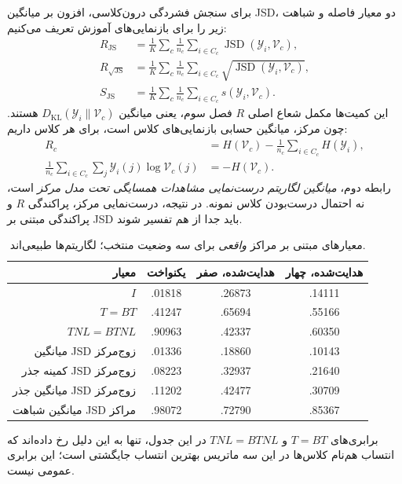 برای سنجش فشردگی درون‌کلاسی، افزون بر میانگین JSD، دو معیار فاصله و شباهت زیر را برای بازنمایی‌های آموزش تعریف می‌کنیم:
\begin{equation}\label{eq:ch4-center-observation-JS-within}
\begin{aligned}
R_{\mathrm{JS}}&=\frac1K\sum_c\frac1{n_c}\sum_{i\in C_c}
\operatorname{JSD}(\mathscr Y_i,\mathcal V_c),\\
R_{\sqrt{\mathrm{JS}}}&=\frac1K\sum_c\frac1{n_c}\sum_{i\in C_c}
\sqrt{\operatorname{JSD}(\mathscr Y_i,\mathcal V_c)},\\
S_{\mathrm{JS}}&=\frac1K\sum_c\frac1{n_c}\sum_{i\in C_c}
s(\mathscr Y_i,\mathcal V_c).
\end{aligned}
\end{equation}
این کمیت‌ها مکمل شعاع اصلی $R$ فصل سوم، یعنی میانگین $D_{\mathrm{KL}}(\mathscr Y_i\|\mathcal V_c)$ هستند. چون مرکز، میانگین حسابی بازنمایی‌های کلاس است، برای هر کلاس داریم:
\begin{equation}\label{eq:ch4-center-observation-R-likelihood}
\begin{aligned}
R_c&=H(\mathcal V_c)-\frac1{n_c}\sum_{i\in C_c}H(\mathscr Y_i),\\
\frac1{n_c}\sum_{i\in C_c}\sum_j\mathscr Y_i(j)\log\mathcal V_c(j)
&=-H(\mathcal V_c).
\end{aligned}
\end{equation}
رابطه دوم، \emph{میانگین لگاریتم درست‌نمایی مشاهدات همسایگی تحت مدل مرکز} است، نه احتمال درست‌بودن کلاس نمونه. در نتیجه، درست‌نمایی مرکز، پراکندگی $R$ و پراکندگی مبتنی بر JSD باید جدا از هم تفسیر شوند.

\begin{table}[htbp]
\centering\small
\caption{معیارهای مبتنی بر مراکز \emph{واقعی} برای سه وضعیت منتخب؛ لگاریتم‌ها طبیعی‌اند.}
\label{tab:ch4-center-observation-geometry}
\begin{tabular}{rccc}\hline
معیار & یکنواخت & هدایت‌شده، صفر & هدایت‌شده، چهار\\\hline
$I$ & .01818 & .26873 & .14111\\
$T=BT$ & .41247 & .65694 & .55166\\
$TNL=BTNL$ & .90963 & .42337 & .60350\\
میانگین JSD زوج‌مرکز & .01336 & .18860 & .10143\\
کمینه جذر JSD زوج‌مرکز & .08223 & .32937 & .21640\\
میانگین جذر JSD زوج‌مرکز & .11202 & .42477 & .30709\\
میانگین شباهت JSD مراکز & .98072 & .72790 & .85367\\\hline
\end{tabular}
\end{table}
برابری‌های $T=BT$ و $TNL=BTNL$ در این جدول، تنها به این دلیل رخ داده‌اند که انتساب هم‌نام کلاس‌ها در این سه ماتریس بهترین انتساب جایگشتی است؛ این برابری عمومی نیست.

